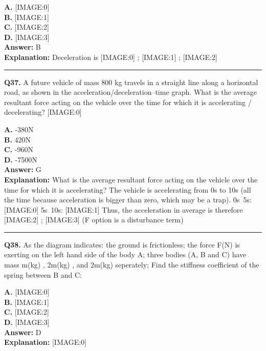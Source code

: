 \documentclass[12pt]{article}
\begin{document}
\textbf{A.} [IMAGE:0] \\
\textbf{B.} [IMAGE:1] \\
\textbf{C.} [IMAGE:2] \\
\textbf{D.} [IMAGE:3] \\

\textbf{Answer:} B \\
\textbf{Explanation:} Deceleration is
[IMAGE:0]
;
[IMAGE:1]
;
[IMAGE:2]

\hrule
\vspace{1em}


\noindent
\textbf{Q37.} A future vehicle of mass 800 kg travels in a straight line along a horizontal road, as shown in the acceleration/deceleration–time graph.
What is the average resultant force acting on the vehicle over the time for which it is accelerating / decelerating?
[IMAGE:0]



\textbf{A.} -380N \\
\textbf{B.} 420N \\
\textbf{C.} -960N \\
\textbf{D.} -7500N \\

\textbf{Answer:} G \\
\textbf{Explanation:} What is the average resultant force acting on the vehicle over the time for which it is accelerating?
The vehicle is accelerating from 0s to 10s (all the time because acceleration is bigger than zero, which may be a trap).
0s~5s:
[IMAGE:0]
5s~10s:
[IMAGE:1]
Thus, the acceleration in average is therefore
[IMAGE:2]
;
[IMAGE:3]
(F option is a disturbance term)

\hrule
\vspace{1em}


\noindent
\textbf{Q38.} As the diagram indicates: the ground is frictionless; the force F(N)
is exerting on the left hand side of the body A; three bodies (A, B and C) have mass m(kg)
, 2m(kg)
, and 2m(kg)
seperately; Find the stiffness coefficient of the spring between B and C:



\textbf{A.} [IMAGE:0] \\
\textbf{B.} [IMAGE:1] \\
\textbf{C.} [IMAGE:2] \\
\textbf{D.} [IMAGE:3] \\

\textbf{Answer:} D \\
\textbf{Explanation:} [IMAGE:0]
\end{document}

